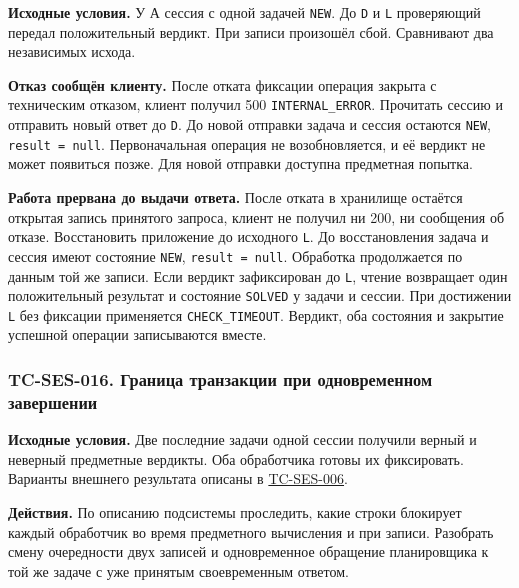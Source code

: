 \documentclass[12pt,a4paper]{article}
\begin{document}
\hypertarget{tc-ses-015-сбой-при-фиксации-вердикта}{}

\hypertarget{tc-ses-015}{}

\textbf{Исходные условия.} У А сессия с одной задачей \texttt{NEW}. До \texttt{D} и \texttt{L} проверяющий передал положительный вердикт. При записи произошёл сбой. Сравнивают два независимых исхода.

\textbf{Отказ сообщён клиенту.} После отката фиксации операция закрыта с техническим отказом, клиент получил 500 \texttt{INTERNAL\_\allowbreak{}ERROR}. Прочитать сессию и отправить новый ответ до \texttt{D}. До новой отправки задача и сессия остаются \texttt{NEW}, \texttt{result\ =\ null}. Первоначальная операция не возобновляется, и её вердикт не может появиться позже. Для новой отправки доступна предметная попытка.

\textbf{Работа прервана до выдачи ответа.} После отката в хранилище остаётся открытая запись принятого запроса, клиент не получил ни 200, ни сообщения об отказе. Восстановить приложение до исходного \texttt{L}. До восстановления задача и сессия имеют состояние \texttt{NEW}, \texttt{result\ =\ null}. Обработка продолжается по данным той же записи. Если вердикт зафиксирован до \texttt{L}, чтение возвращает один положительный результат и состояние \texttt{SOLVED} у задачи и сессии. При достижении \texttt{L} без фиксации применяется \texttt{CHECK\_\allowbreak{}TIMEOUT}. Вердикт, оба состояния и закрытие успешной операции записываются вместе.

\subsubsection{TC-SES-016. Граница транзакции при одновременном завершении}\label{tc-ses-016-ux433ux440ux430ux43dux438ux446ux430-ux442ux440ux430ux43dux437ux430ux43aux446ux438ux438-ux43fux440ux438-ux43eux434ux43dux43eux432ux440ux435ux43cux435ux43dux43dux43eux43c-ux437ux430ux432ux435ux440ux448ux435ux43dux438ux438}

\hypertarget{tc-ses-016-граница-транзакции-при-одновременном-завершении}{}

\hypertarget{tc-ses-016}{}

\textbf{Исходные условия.} Две последние задачи одной сессии получили верный и неверный предметные вердикты. Оба обработчика готовы их фиксировать. Варианты внешнего результата описаны в {\hyperlink{tc-ses-006}{TC-SES-006}}.

\textbf{Действия.} По описанию подсистемы проследить, какие строки блокирует каждый обработчик во время предметного вычисления и при записи. Разобрать смену очередности двух записей и одновременное обращение планировщика к той же задаче с уже принятым своевременным ответом.
\end{document}
